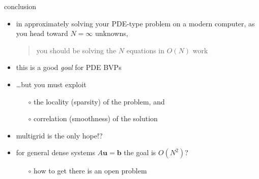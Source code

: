 \documentclass[hide notes,intlimits,usenames,dvipsnames]{beamer}
\newcommand{\bb}{\mathbf{b}}
\newcommand{\bu}{\mathbf{u}}
\begin{document}
\begin{frame}{conclusion}
\begin{itemize}
\item in approximately solving your PDE-type problem on a modern computer, as you head toward $N=\infty$ unknowns,

\bigskip
\begin{quote}
\alert{you should be solving the $N$ equations in $O(N)$ work}
\end{quote}

\bigskip
\item this is a good \emph{goal} for PDE BVPs
\item \dots but you must exploit
    \begin{itemize}
    \item[$\circ$] the locality (sparsity) of the problem, and
    \item[$\circ$] correlation (smoothness) of the solution
    \end{itemize}
\item multigrid is the only hope!?

\bigskip
\item for general dense systems $A\bu=\bb$ the goal is $O(N^2)$?
    \begin{itemize}
    \item[$\circ$] how to get there is an open problem
    \end{itemize}
\end{itemize}
\end{frame}
\end{document}
